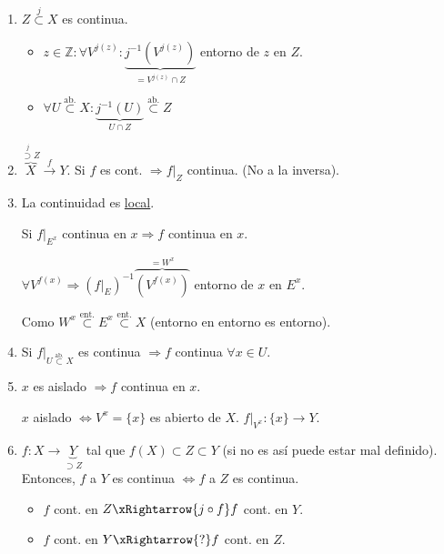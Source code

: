 \begin{obs}
\begin{enumerate}
    \item $Z \stackrel{j}{\subset} X$ es continua.
    \begin{demo}
        \begin{itemize}
            \item $z \in \mathbb{Z}: \forall V^{j\left( z \right)} : \underbrace{j^{-1}\left( V^{j\left( z \right) } \right)}_{= V^{j\left( z \right)} \cap Z}$ entorno de $z$ en $Z$.
            \item $\forall U \stackrel{\text{ab.}}{\subset } X: \underbrace{j^{-1}\left( U \right)}_{U \cap Z} \stackrel{\text{ab.}}{\subset} Z$
        \end{itemize}
    \end{demo}

    \item $\overbrace{X}^{\stackrel{j}{\supset} Z} \xrightarrow{f} Y$. Si $f$ es cont. $\Rightarrow f|_Z$ continua. (No a la inversa).

    \item La continuidad es \underline{local}. 

    Si $f|_{E^x}$ continua en $x \Rightarrow f$ continua en $x$.
    \begin{demo}
        $\forall V^{f\left( x \right)} \Rightarrow \left( f|_{E} \right)^{-1}\overbrace{\left( V^{f\left( x \right)} \right)}^{= W^x}$ entorno de $x$ en $E^x$.

        Como $W^x \stackrel{\text{ent.}}{\subset} E^x \stackrel{\text{ent.}}{\subset} X$ (entorno en entorno es entorno). %
    \end{demo}

    \item Si $f|_{U \stackrel{\text{ab.}}{\subset} X}$ es continua $\Rightarrow f$ continua $\forall x \in U$.

    \item $x$ es aislado $\Rightarrow f$ continua en $x$. 
    \begin{demo}
        $x$ aislado $\Leftrightarrow V^x = \{x\}$ es abierto de $X$. $f|_{V^x} : \{x\} \rightarrow Y$.
    \end{demo}

    \item $f: X \rightarrow \underbrace{Y}_{\supset Z}$ tal que $f\left( X \right) \subset Z \subset Y$ (si no es así puede estar mal definido). Entonces, $f$ a $Y$ es continua $\Leftrightarrow f$ a $Z$ es continua.
    \begin{demo}
        \begin{itemize}
            \item $f$ cont. en $Z \xRightarrow{j \circ f} f$ cont. en $Y$.
            \item $f$ cont. en $Y \xRightarrow{?} f$ cont. en $Z$. 


\end{itemize}
\end{demo}
\end{enumerate}
\end{obs}
